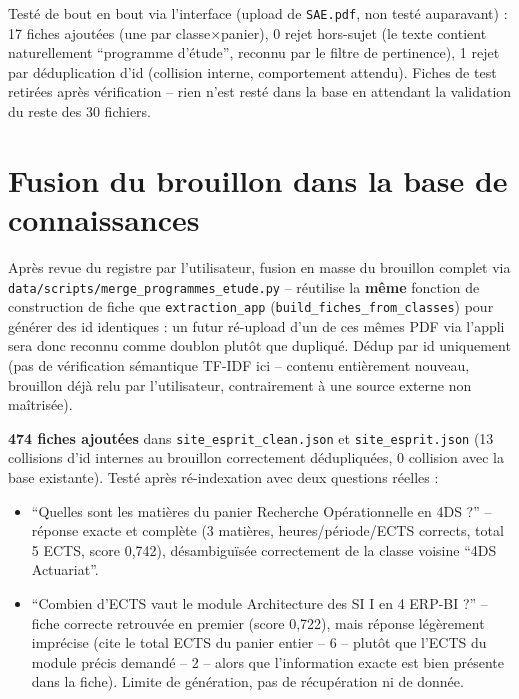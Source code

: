 \documentclass[11pt,a4paper]{report}
\begin{document}
\begin{statutfait}
Testé de bout en bout via l'interface (upload de \texttt{SAE.pdf}, non testé
auparavant) : 17 fiches ajoutées (une par classe$\times$panier), 0 rejet hors-sujet
(le texte contient naturellement ``programme d'étude'', reconnu par le filtre de
pertinence), 1 rejet par déduplication d'id (collision interne, comportement attendu).
Fiches de test retirées après vérification -- rien n'est resté dans la base en
attendant la validation du reste des 30 fichiers.
\end{statutfait}

\section{Fusion du brouillon dans la base de connaissances}

Après revue du registre par l'utilisateur, fusion en masse du brouillon complet via
\texttt{data/scripts/merge\_programmes\_etude.py} -- réutilise la \textbf{même} fonction
de construction de fiche que \texttt{extraction\_app}
(\texttt{build\_fiches\_from\_classes}) pour générer des id identiques : un futur
ré-upload d'un de ces mêmes PDF via l'appli sera donc reconnu comme doublon plutôt que
dupliqué. Dédup par id uniquement (pas de vérification sémantique TF-IDF ici -- contenu
entièrement nouveau, brouillon déjà relu par l'utilisateur, contrairement à une source
externe non maîtrisée).

\begin{statutfait}
\textbf{474 fiches ajoutées} dans \texttt{site\_esprit\_clean.json} et
\texttt{site\_esprit.json} (13 collisions d'id internes au brouillon correctement
dédupliquées, 0 collision avec la base existante). Testé après ré-indexation avec deux
questions réelles :
\begin{itemize}
    \item ``Quelles sont les matières du panier Recherche Opérationnelle en 4DS ?'' --
    réponse exacte et complète (3 matières, heures/période/ECTS corrects, total 5 ECTS,
    score 0{,}742), désambiguïsée correctement de la classe voisine ``4DS Actuariat''.
    \item ``Combien d'ECTS vaut le module Architecture des SI I en 4 ERP-BI ?'' -- fiche
    correcte retrouvée en premier (score 0{,}722), mais réponse légèrement imprécise
    (cite le total ECTS du panier entier -- 6 -- plutôt que l'ECTS du module précis
    demandé -- 2 -- alors que l'information exacte est bien présente dans la fiche).
    Limite de génération, pas de récupération ni de donnée.
\end{itemize}
\end{statutfait}
\end{document}
